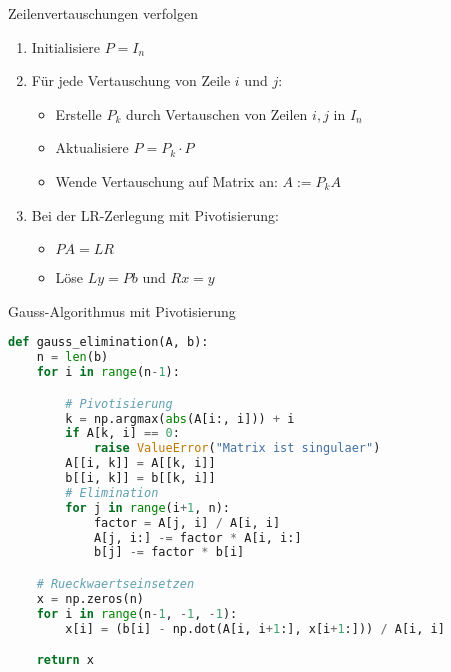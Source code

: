 \begin{KR}{Zeilenvertauschungen verfolgen}
\begin{enumerate}
    \item Initialisiere $P = I_n$
    \item Für jede Vertauschung von Zeile $i$ und $j$:
    \begin{itemize}
        \item Erstelle $P_k$ durch Vertauschen von Zeilen $i,j$ in $I_n$
        \item Aktualisiere $P = P_k \cdot P$
        \item Wende Vertauschung auf Matrix an: $A := P_kA$
    \end{itemize}
    \item Bei der LR-Zerlegung mit Pivotisierung:
    \begin{itemize}
        \item $PA = LR$ 
        \item Löse $Ly = Pb$ und $Rx = y$
    \end{itemize}
\end{enumerate}
\end{KR}

\begin{examplecode}{Gauss-Algorithmus mit Pivotisierung}
\begin{lstlisting}[language=Python, style=basesmol]
def gauss_elimination(A, b):
    n = len(b)
    for i in range(n-1):

        # Pivotisierung
        k = np.argmax(abs(A[i:, i])) + i
        if A[k, i] == 0:
            raise ValueError("Matrix ist singulaer")
        A[[i, k]] = A[[k, i]]
        b[[i, k]] = b[[k, i]]
        # Elimination
        for j in range(i+1, n):
            factor = A[j, i] / A[i, i]
            A[j, i:] -= factor * A[i, i:]
            b[j] -= factor * b[i]

    # Rueckwaertseinsetzen
    x = np.zeros(n)
    for i in range(n-1, -1, -1):
        x[i] = (b[i] - np.dot(A[i, i+1:], x[i+1:])) / A[i, i]

    return x
\end{lstlisting}
\end{examplecode}



